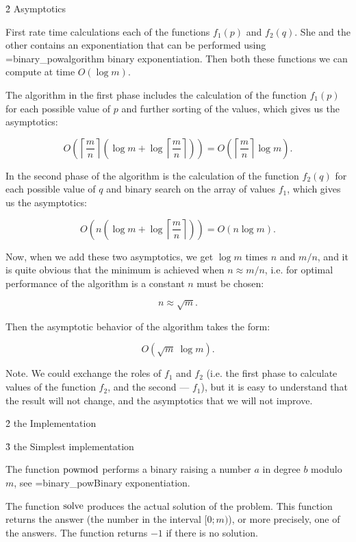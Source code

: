\h2{ Asymptotics }

First rate time calculations each of the functions $f_1(p)$ and $f_2(q)$. She and the other contains an exponentiation that can be performed using \algohref=binary_pow{algorithm binary exponentiation}. Then both these functions we can compute at time $O(\log m)$.

The algorithm in the first phase includes the calculation of the function $f_1(p)$ for each possible value of $p$ and further sorting of the values, which gives us the asymptotics:

$$ O\left( \left\lceil \frac{m}{n} \right\rceil \left( \log m + \log \left\lceil \frac{m}{n} \right\rceil \right) \right) = O\left( \left\lceil \frac{m}{n} \right\rceil \log m \right). $$

In the second phase of the algorithm is the calculation of the function $f_2(q)$ for each possible value of $q$ and binary search on the array of values $f_1$, which gives us the asymptotics:

$$ O\left( n \left( \log m + \log \left\lceil \frac{m}{n} \right\rceil \right) \right) = O\left( n \log m \right). $$

Now, when we add these two asymptotics, we get $\log m$ times $n$ and $m/n$, and it is quite obvious that the minimum is achieved when $n \approx m/n$, i.e. for optimal performance of the algorithm is a constant $n$ must be chosen:

$$ n \approx \sqrt{m}. $$

Then the asymptotic behavior of the algorithm takes the form:

$$ O\left( \sqrt{m} ~ \log m \right). $$

Note. We could exchange the roles of $f_1$ and $f_2$ (i.e. the first phase to calculate values of the function $f_2$, and the second --- $f_1$), but it is easy to understand that the result will not change, and the asymptotics that we will not improve.


\h2{ the Implementation }


\h3{ the Simplest implementation }

The function $\rm powmod$ performs a binary raising a number $a$ in degree $b$ modulo $m$, see \algohref=binary_pow{Binary exponentiation}.

The function $\rm solve$ produces the actual solution of the problem. This function returns the answer (the number in the interval $[0;m)$), or more precisely, one of the answers. The function returns $-1$ if there is no solution.

